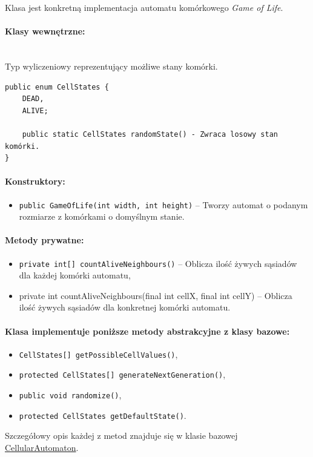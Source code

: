 \documentclass{report}
\begin{document}
Klasa jest konkretną implementacja automatu komórkowego \textit{Game of Life}.

\paragraph{Klasy wewnętrzne:} \mbox{} \\
Typ wyliczeniowy reprezentujący możliwe stany komórki.
\begin{verbatim}
public enum CellStates {
    DEAD,
    ALIVE;

    public static CellStates randomState() - Zwraca losowy stan komórki.
}
\end{verbatim}

\paragraph{Konstruktory:}
\begin{itemize}
	\item \texttt{public GameOfLife(int width, int height)} -- Tworzy automat o podanym rozmiarze z komórkami o domyślnym stanie.
\end{itemize}

\paragraph{Metody prywatne:}
\begin{itemize}
    \item \texttt{private int[] countAliveNeighbours()} -- Oblicza ilość żywych sąsiadów dla każdej komórki automatu,
    \item private int countAliveNeighbours(final int cellX, final int cellY) -- Oblicza ilość żywych sąsiadów dla konkretnej komórki automatu.
\end{itemize}

\paragraph{Klasa implementuje poniższe metody abstrakcyjne z klasy bazowe:}
\begin{itemize}
    \item \texttt{CellStates[] getPossibleCellValues()},
    \item \texttt{protected CellStates[] generateNextGeneration()},
    \item \texttt{public void randomize()},
    \item \texttt{protected CellStates getDefaultState()}.
\end{itemize}
Szczegółowy opis każdej z metod znajduje się w klasie bazowej \hyperref[subsec:cellularAutomaton]{CellularAutomaton}.
\end{document}
